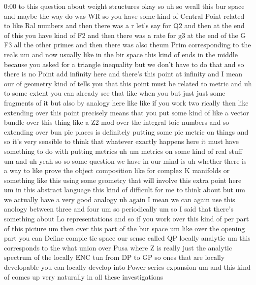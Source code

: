 \begin{unfinished}{0:00}
to  this  question  about  weight  structures
okay
so  uh  so  weall  this  bur  space  and  maybe
the  way  do  was  WR  so  you  have  some  kind
of  Central  Point  related  to  like  Ral
numbers  and  then  there  was  a  r  let's  say
for  Q2  and  then  at  the  end  of  this  you
have  kind  of
F2  and  then  there  was  a  rate  for  g3  at
the  end  of  the  G
F3  all  the  other  primes  and  then  there
was  also  theum
Prim  corresponding  to  the
reals  um  and  now
usually  like  in  the  bir  space  this  kind
of  ends  in  the  middle  because  you  asked
for  a  triangle  inequality  but  we  don't
have  to  do  that  and  so  there  is  no  Point
add  infinity
here
and  there's  this  point  at  infinity  and  I
mean  our  of  geometry  kind  of  tells  you
that  this  point  must  be  related  to
metric
and  uh  to  some  extent  you  can  already
see  that  like  when
you  but  just  just  some  fragments  of  it
but  also  by  analogy  here  like  like  if
you  work  two  rically  then  like  extending
over  this  point  precisely  means  that  you
put  some  kind  of  like  a  vector  bundle
over  this  thing  like  a
Z2  mod  over  the  integral  toic  numbers
and  so  extending  over  bun  pic  places  is
definitely  putting  some  pic  metric  on
things  and  so  it's  very  sensible  to
think  that  whatever  exactly  happens  here
it  must  have  something  to  do  with
putting
metrics
uh  um  metrics  on  some  kind  of  real  stuff
um
and  uh  yeah  so  so  some  question  we  have
in  our  mind  is  uh  whether  there  is  a  way
to  like  prove  the  object  composition
like  for  complex  K  manifolds  or
something  like  this  using  some  geometry
that  will  involve  this  extra  point
here
um  in  this  abstract  language  this  kind
of  difficult  for  me  to  think  about  but
um  we  actually  have  a  very  good  analogy
uh  again  I  mean  we  can  again  use  this
anology  between  three  and  four  um  so
periodically  um  so  I  said  that  there's
something  about  Lo  representations  and
so  if  you  work  over  this  kind  of  per
part  of  this
picture
um  then  over  this  part  of  the  bur  space
um  like  over  the  opening  part  you  can
Define  comple  tic  space  our  sense  called
QP  locally  analytic  um  this  corresponds
to
the  what  union  over
Pusa  where  Z  is  really  just  the  analytic
spectrum  of  the  locally  ENC  tun  from  DP
to
GP  so  ones  that  are  locally  developable
you  can  locally  develop  into  Power
series
expansion
um  and  this  kind  of  comes  up  very
naturally  in  all  these  investigations

\end{unfinished}
